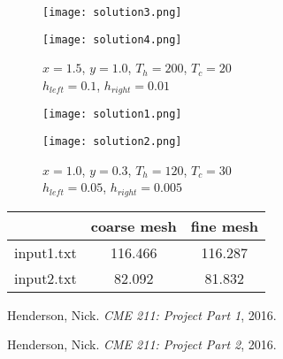 \documentclass[12pt]{article}
\begin{document}
\begin{figure}[H]
\centering
\begin{minipage}{0.5\textwidth}
  \centering
  \texttt{[image: solution3.png]}
\end{minipage}%
\begin{minipage}{.5\textwidth}
  \centering
  \texttt{[image: solution4.png]}
\end{minipage}
  \caption{$x=1.5$, $y=1.0$, $T_h=200$, $T_c=20$ \\
           $h_{left} = 0.1$, $h_{right} = 0.01$}
\end{figure}

\begin{figure}[H]
\centering
\begin{minipage}{0.5\textwidth}
  \centering
  \texttt{[image: solution1.png]}
\end{minipage}%
\begin{minipage}{.5\textwidth}
  \centering
  \texttt{[image: solution2.png]}
\end{minipage}
  \caption{$x=1.0$, $y=0.3$, $T_h=120$, $T_c=30$ \\
           $h_{left} = 0.05$, $h_{right} = 0.005$}
\end{figure}

\begin{center}
\begin{tabular}{|c|c|c|}
  \hline
   & coarse mesh & fine mesh \\
  \hline
  input1.txt & 116.466 & 116.287 \\
  input2.txt & 82.092 & 81.832 \\
  \hline 
\end{tabular}
\end{center}

\begin{thebibliography}{3}
  Henderson, Nick. \textit{CME 211: Project Part 1}, 2016.
  
  Henderson, Nick. \textit{CME 211: Project Part 2}, 2016.
\end{thebibliography}
\end{document}
